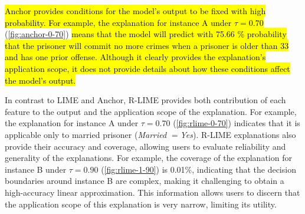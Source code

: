 \documentclass[runningheads]{llncs}
\begin{document}
{\hl{%
  Anchor provides conditions for the model's output to be fixed with high
  probability.
  For example,
  the explanation for instance A under $\tau=0.70$
} (\cref{fig:anchor-0-70})
\hl{%
  means that the model will predict with 75.66 \% probability
  that the prisoner will commit no more crimes
  when a prisoner is older than 33 and has one prior offense.
  Although it clearly provides the explanation's application scope,
  it does not provide details about how these conditions affect the model's output.
}

In contrast to LIME and Anchor,
R-LIME provides both contribution of each feature to the output and
the application scope of the explanation.
For example, the explanation for instance A
under $\tau=0.70$ (\cref{fig:rlime-0-70}) indicates that it is applicable
only to married prisoner (\emph{Married} $=$\emph{Yes}).
R-LIME explanations also provide their accuracy and coverage,
allowing users to evaluate reliability and generality of the explanations.
For example, the coverage of the explanation for instance B under $\tau=0.90$
(\cref{fig:rlime-1-90}) is 0.01\%,
indicating that the decision boundaries around instance B are complex,
making it challenging to obtain a high-accuracy linear approximation.
This information allows users to discern that
the application scope of this explanation is very narrow, limiting its utility.

}
\end{document}
